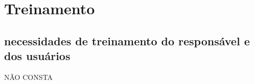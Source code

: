 \chapter{Treinamento}

\section{necessidades de treinamento do responsável e dos usuários}
NÃO CONSTA
